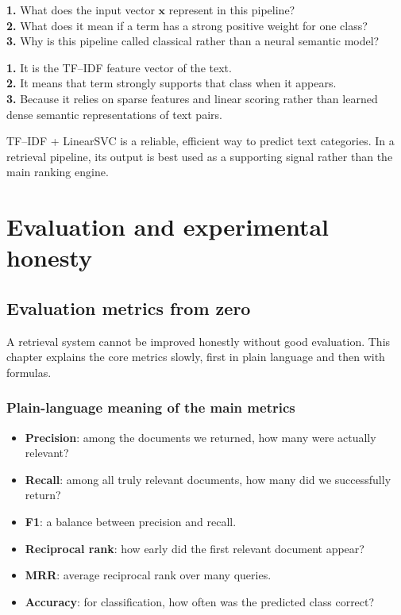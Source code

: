 \documentclass[11pt,oneside]{report}
\newcommand{\term}[1]{\textbf{#1}}
\newcommand{\vect}[1]{\mathbf{#1}}
\begin{document}
\begin{selfcheckbox}
\textbf{1.} What does the input vector $\vect{x}$ represent in this pipeline?\\
\textbf{2.} What does it mean if a term has a strong positive weight for one class?\\
\textbf{3.} Why is this pipeline called classical rather than a neural semantic model?
\end{selfcheckbox}

\begin{answerbox}
\textbf{1.} It is the TF--IDF feature vector of the text.\\
\textbf{2.} It means that term strongly supports that class when it appears.\\
\textbf{3.} Because it relies on sparse features and linear scoring rather than learned dense semantic representations of text pairs.
\end{answerbox}

\begin{rememberbox}
TF--IDF + LinearSVC is a reliable, efficient way to predict text categories. In a retrieval pipeline, its output is best used as a supporting signal rather than the main ranking engine.
\end{rememberbox}


\part[Evaluation]{Evaluation and experimental honesty}
\chapter[Evaluation Metrics]{Evaluation metrics from zero}

\begin{purposebox}
A retrieval system cannot be improved honestly without good evaluation. This chapter explains the core metrics slowly, first in plain language and then with formulas.
\end{purposebox}

\section*{Plain-language meaning of the main metrics}
\begin{itemize}
\item \term{Precision}: among the documents we returned, how many were actually relevant?
\item \term{Recall}: among all truly relevant documents, how many did we successfully return?
\item \term{F1}: a balance between precision and recall.
\item \term{Reciprocal rank}: how early did the first relevant document appear?
\item \term{MRR}: average reciprocal rank over many queries.
\item \term{Accuracy}: for classification, how often was the predicted class correct?
\end{itemize}
\end{document}
